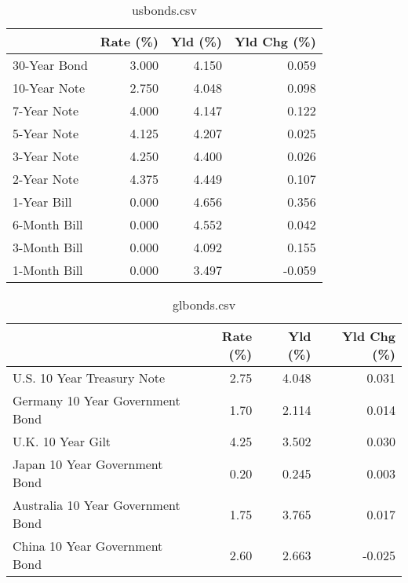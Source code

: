 \documentclass{article}%
\begin{document}
%


\begin{table}[htbp]%
\caption{usbonds.csv}%
\centering%
\begin{adjustbox}{width=1\textwidth}%
\begin{tabular}{lrrr}
\toprule
             &  Rate (\%) &  Yld (\%) &  Yld Chg (\%) \\
\midrule
30-Year Bond &     3.000 &    4.150 &        0.059 \\
10-Year Note &     2.750 &    4.048 &        0.098 \\
 7-Year Note &     4.000 &    4.147 &        0.122 \\
 5-Year Note &     4.125 &    4.207 &        0.025 \\
 3-Year Note &     4.250 &    4.400 &        0.026 \\
 2-Year Note &     4.375 &    4.449 &        0.107 \\
 1-Year Bill &     0.000 &    4.656 &        0.356 \\
6-Month Bill &     0.000 &    4.552 &        0.042 \\
3-Month Bill &     0.000 &    4.092 &        0.155 \\
1-Month Bill &     0.000 &    3.497 &       -0.059 \\
\bottomrule
\end{tabular}
%
\end{adjustbox}%
\end{table}

%


\begin{table}[htbp]%
\caption{glbonds.csv}%
\centering%
\begin{adjustbox}{width=1\textwidth}%
\begin{tabular}{lrrr}
\toprule
                                  &  Rate (\%) &  Yld (\%) &  Yld Chg (\%) \\
\midrule
       U.S. 10 Year Treasury Note &      2.75 &    4.048 &        0.031 \\
  Germany 10 Year Government Bond &      1.70 &    2.114 &        0.014 \\
                U.K. 10 Year Gilt &      4.25 &    3.502 &        0.030 \\
    Japan 10 Year Government Bond &      0.20 &    0.245 &        0.003 \\
Australia 10 Year Government Bond &      1.75 &    3.765 &        0.017 \\
    China 10 Year Government Bond &      2.60 &    2.663 &       -0.025 \\
\bottomrule
\end{tabular}
%
\end{adjustbox}%
\end{table}
\end{document}
